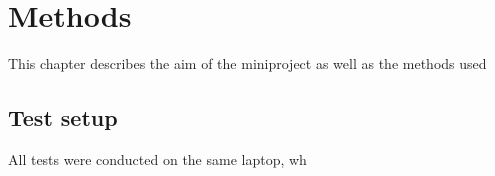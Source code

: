 \chapter{Methods}
This chapter describes the aim of the miniproject as well as the methods used 
\section{Test setup}
All tests were conducted on the same laptop, wh 